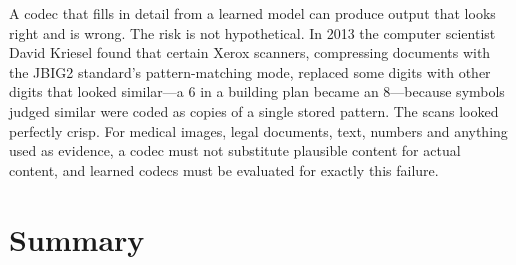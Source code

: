 \begin{pitfall}
A codec that fills in detail from a learned model can produce output that looks right and is wrong. The
risk is not hypothetical. In 2013 the computer scientist David Kriesel found that certain Xerox scanners,
compressing documents with the JBIG2 standard's pattern-matching mode, replaced some digits with other
digits that looked similar---a 6 in a building plan became an 8---because symbols judged similar were coded
as copies of a single stored pattern. The scans looked perfectly crisp. For medical images, legal documents,
text, numbers and anything used as evidence, a codec must not substitute plausible content for actual
content, and learned codecs must be evaluated for exactly this failure.
\end{pitfall}

\section{Summary}

